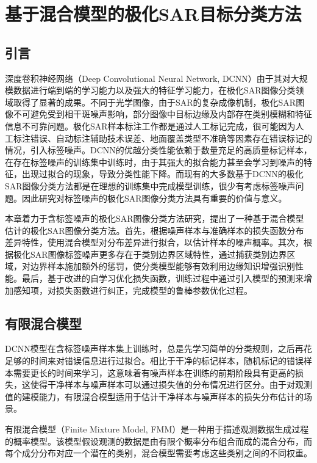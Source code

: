\chapter{基于混合模型的极化SAR目标分类方法}
\section{引言}
深度卷积神经网络（Deep Convolutional Neural Network, DCNN）由于其对大规模数据进行端到端的学习能力以及强大的特征学习能力，在极化SAR图像分类领域取得了显著的成果。不同于光学图像，由于SAR的复杂成像机制，极化SAR图像不可避免受到相干斑噪声影响，部分图像中目标边缘及内部存在类别模糊和特征信息不可靠问题。极化SAR样本标注工作都是通过人工标记完成，很可能因为人工标注错误、自动标注辅助技术误差、地面覆盖类型不准确等因素存在错误标记的情况，引入标签噪声。DCNN的优越分类性能依赖于数量充足的高质量标记样本，在存在标签噪声的训练集中训练时，由于其强大的拟合能力甚至会学习到噪声的特征，出现过拟合的现象，导致分类性能下降。而现有的大多数基于DCNN的极化SAR图像分类方法都是在理想的训练集中完成模型训练，很少有考虑标签噪声问题。因此研究对标签噪声的极化SAR图像分类方法具有重要的价值与意义。

本章着力于含标签噪声的极化SAR图像分类方法研究，提出了一种基于混合模型估计的极化SAR图像分类方法。首先，根据噪声样本与准确样本的损失函数分布差异特性，使用混合模型对分布差异进行拟合，以估计样本的噪声概率。其次，根据极化SAR图像标签噪声更多存在于类别边界区域特性，通过捕获类别边界区域，对边界样本施加额外的惩罚，使分类模型能够有效利用边缘知识增强识别性能。最后，基于改进的自学习优化损失函数，训练过程中通过引入模型的预测来增加感知项，对损失函数进行纠正，完成模型的鲁棒参数优化过程。

\section{有限混合模型}
DCNN模型在含标签噪声样本集上训练时，总是先学习简单的分类规则，之后再花足够的时间来对错误信息进行过拟合。相比于干净的标记样本，随机标记的错误样本需要更长的时间来学习，这意味着有噪声样本在训练的前期阶段具有更高的损失，这使得干净样本与噪声样本可以通过损失值的分布情况进行区分。由于对观测值的建模能力，有限混合模型适用于估计干净样本与噪声样本的损失分布估计的场景。

有限混合模型（Finite Mixture Model, FMM）是一种用于描述观测数据生成过程的概率模型。该模型假设观测的数据是由有限个概率分布组合而成的混合分布，而每个成分分布对应一个潜在的类别，混合模型需要考虑这些类别之间的不同权重。

